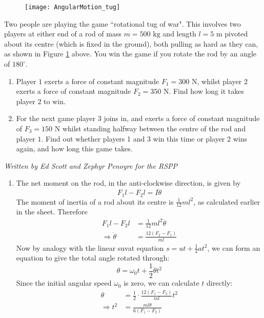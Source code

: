 \begin{problem}
{
\begin{figure}[h] 
\centering
\texttt{[image: AngularMotion\_tug]}
\caption{}
\label{fig:AngularMotion_tug}
\end{figure}
Two people are playing the game ``rotational tug of war". This involves two players at either end of a rod of mass $m=500\textrm{ kg}$ and length $l=5\textrm{ m}$ pivoted about its centre (which is fixed in the ground), both pulling as hard as they can, as shown in Figure \ref{fig:AngularMotion_tug} above. You win the game if you rotate the rod by an angle of $180^{\circ}$.
\begin{enumerate}
\item Player $1$ exerts a force of constant magnitude $F_1=300\textrm{ N}$, whilst player $2$ exerts a force of constant magnitude $F_2=350\textrm{ N}$. Find how long it takes player $2$ to win. 
\item For the next game player 3 joins in, and exerts a force of constant magnitude of $F_3= 150\textrm{ N}$ whilst standing halfway between the centre of the rod and player $1$. Find out whether players 1 and 3 win this time or player 2 wins again, and how long this game takes. 
\end{enumerate}
 }
{\textit{Written by Ed Scott and Zephyr Penoyre for the RSPP}}
{
\begin{enumerate}
\item The net moment on the rod, in the anti-clockwise direction, is given by 
\begin{equation*}
F_1l-F_2l=I\ddot\theta
\end{equation*}
The moment of inertia of a rod about its centre is $\frac{1}{12}ml^2$, as calculated earlier in the sheet. Therefore
\begin{align*}
F_1l-F_2l&=\frac{1}{12}ml^2\ddot\theta \\
\Rightarrow \ddot\theta&=\frac{12(F_2-F_1)}{ml}
\end{align*}
Now by analogy with the linear suvat equation $s=ut+\frac{1}{2}at^2$, we can form an equation to give the total angle rotated through:
\begin{equation*}
\theta=\omega_0t+\frac{1}{2}\ddot\theta t^2
\end{equation*}
Since the initial angular speed $\omega_0$ is zero, we can calculate $t$ directly:
\begin{align*}
\theta&=\frac{1}{2}\cdot\frac{12(F_1-F_2)}{ml}t^2 \\
\Rightarrow t^2&=\frac{ml\theta}{6(F_1-F_2)}

\end{align*}
\end{enumerate}}
\end{problem}

